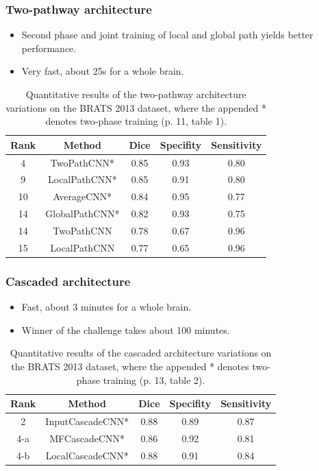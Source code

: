 \documentclass[aspectratio=43, notes]{beamer} 	%
\begin{document}
\begin{frame}
	\frametitle<presentation>{Two-pathway architecture}
	\begin{itemize}
		\item Second phase and joint training of local and global path yields better performance.
		\item Very fast, about 25s for a whole brain.
	\end{itemize}
	\begin{table}
		\caption{Quantitative results of the two-pathway architecture variations on the BRATS 2013 dataset, where the appended * denotes two-phase training (p. 11, table 1).}
		\label{tab:beispiel}
		\centering
			\begin{tabular}{ccccc}
				\toprule
				Rank & Method & Dice & Specifity & Sensitivity \\
				\midrule
				4 	& TwoPathCNN* 		& 0.85	& 0.93	& 0.80\\
				9 	& LocalPathCNN* 		& 0.85	& 0.91	& 0.80\\
				10 	& AverageCNN* 		& 0.84	& 0.95	& 0.77\\
				14 	& GlobalPathCNN* 	& 0.82	& 0.93	& 0.75\\
				14 	& TwoPathCNN 		& 0.78	& 0.67	& 0.96\\
				15 	& LocalPathCNN		& 0.77	& 0.65	& 0.96\\
				\bottomrule
			\end{tabular}
	\end{table}
\end{frame}

\begin{frame}
	\frametitle<presentation>{Cascaded architecture}
	\begin{itemize}
		\item Fast, about 3 minutes for a whole brain.
		\item Winner of the challenge takes about 100 minutes.
	\end{itemize}
	\begin{table}
		\caption{Quantitative results of the cascaded architecture variations on the BRATS 2013 dataset, where the appended * denotes two-phase training (p. 13, table 2).}
		\label{tab:beispiel}
		\centering
			\begin{tabular}{ccccc}
				\toprule
				Rank & Method & Dice & Specifity & Sensitivity \\
				\midrule
				2 	& InputCascadeCNN*	& 0.88	& 0.89	& 0.87\\
				4-a & MFCascadeCNN* 		& 0.86	& 0.92	& 0.81\\
				4-b & LocalCascadeCNN* 	& 0.88	& 0.91	& 0.84\\
				\bottomrule
			\end{tabular}
	\end{table}
\end{frame}
\end{document}
